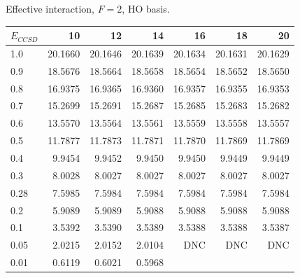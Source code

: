 \begin{table}
\begin{center}
Effective interaction, $F=2$, HO basis.\\
\begin{tabular}{l|rrrrrr}
\hline 
$E_{CCSD}$ & 10 & 12 & 14 & 16 & 18 & 20 \\
\hline \hline
1.0 & 20.1660 & 20.1646 & 20.1639 & 20.1634 & 20.1631 & 20.1629  \\ 
0.9 & 18.5676 & 18.5664 & 18.5658 & 18.5654 & 18.5652 & 18.5650  \\ 
0.8 & 16.9375 & 16.9365 & 16.9360 & 16.9357 & 16.9355 & 16.9353  \\ 
0.7 & 15.2699 & 15.2691 & 15.2687 & 15.2685 & 15.2683 & 15.2682  \\ 
0.6 & 13.5570 & 13.5564 & 13.5561 & 13.5559 & 13.5558 & 13.5557  \\ 
0.5 & 11.7877 & 11.7873 & 11.7871 & 11.7870 & 11.7869 & 11.7869  \\ 
0.4 & 9.9454 & 9.9452 & 9.9450 & 9.9450 & 9.9449 & 9.9449  \\ 
0.3 & 8.0028 & 8.0027 & 8.0027 & 8.0027 & 8.0027 & 8.0027  \\ 
0.28 & 7.5985 & 7.5984 & 7.5984 & 7.5984 & 7.5984 & 7.5984  \\ 
0.2 & 5.9089 & 5.9089 & 5.9088 & 5.9088 & 5.9088 & 5.9088  \\ 
0.1 & 3.5392 & 3.5390 & 3.5389 & 3.5388 & 3.5388 & 3.5387  \\ 
0.05 & 2.0215 & 2.0152 & 2.0104 & DNC & DNC & DNC  \\ 
0.01 & 0.6119 & 0.6021 & 0.5968  \\ 
\hline \hline
\end{tabular}
\end{center}
\end{table}


